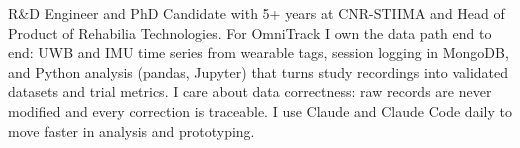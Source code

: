 {R\&D Engineer and PhD Candidate with 5+ years at CNR-STIIMA and Head of Product of Rehabilia Technologies. For OmniTrack I own the data path end to end: UWB and IMU time series from wearable tags, session logging in MongoDB, and Python analysis (pandas, Jupyter) that turns study recordings into validated datasets and trial metrics. I care about data correctness: raw records are never modified and every correction is traceable. I use Claude and Claude Code daily to move faster in analysis and prototyping.}
